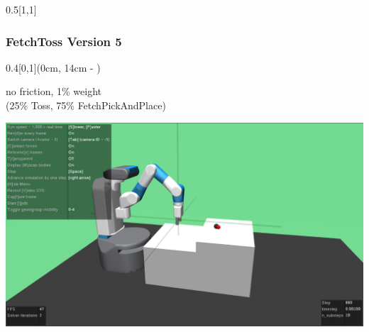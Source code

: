 \begin{frame}
\begin{textblock*}{0.5\paperwidth}[1,1]
	\end{textblock*}
	
	

	
\end{frame}
\clearpage









\begin{frame}
	\frametitle{FetchToss Version 5}	
	\vspace{1cm}
	
	\begin{textblock*}{0.4\paperwidth}[0,1](0cm, 14cm - \PraesentationSeitenrand)%
		
		no friction, 1\% weight \\
		(25\% Toss, 75\% FetchPickAndPlace)
		
		\includegraphics[width=0.4\paperwidth]{./Ressourcen/Figures/FetchToss-v5.pdf}
		
	\end{textblock*}
	

\end{frame}
